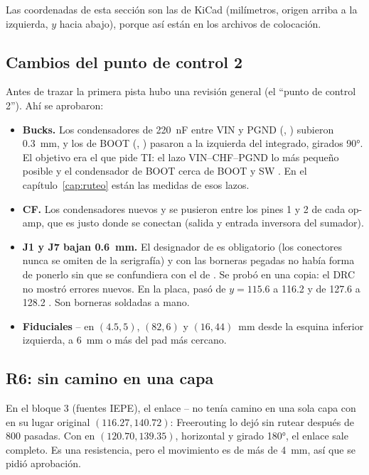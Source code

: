 Las coordenadas de esta sección son las de KiCad (milímetros, origen arriba a la izquierda, $y$ hacia abajo),
porque así están en los archivos de colocación.

\subsection{Cambios del punto de control 2}
Antes de trazar la primera pista hubo una revisión general (el ``punto de control 2''). Ahí se aprobaron:
\begin{itemize}
  \item \textbf{Bucks.} Los condensadores de \SI{220}{\nano\farad} entre VIN y PGND (, ) subieron
        \SI{0.3}{\milli\meter}, y los de BOOT (, ) pasaron a la izquierda del integrado, girados
        \ang{90}. El objetivo era el que pide TI: el lazo VIN--CHF--PGND lo más pequeño posible y el condensador de
        BOOT cerca de BOOT y SW . En el capítulo~\ref{cap:ruteo} están las medidas de esos lazos.
  \item \textbf{CF.} Los condensadores nuevos  y  se pusieron entre los pines 1 y 2 de cada op-amp,
        que es justo donde se conectan (salida y entrada inversora del sumador).
  \item \textbf{J1 y J7 bajan \SI{0.6}{\milli\meter}.} El designador de  es obligatorio (los conectores nunca
        se omiten de la serigrafía) y con las borneras pegadas no había forma de ponerlo sin que se confundiera con
        el de . Se probó en una copia: el DRC no mostró errores nuevos. En la placa,  pasó de
        $y = \num{115.6}$ a \num{116.2} y  de \num{127.6} a \num{128.2} \medido. Son borneras soldadas a mano.
  \item \textbf{Fiduciales} -- en $(\num{4.5}, \num{5})$, $(\num{82}, \num{6})$ y
        $(\num{16}, \num{44})$~\si{\milli\meter} desde la esquina inferior izquierda, a \SI{6}{\milli\meter} o más del
        pad más cercano.
\end{itemize}

\subsection{R6: sin camino en una capa}
En el bloque 3 (fuentes IEPE), el enlace -- no tenía camino en una sola capa con  en su
lugar original $(\num{116.27}, \num{140.72})$: Freerouting lo dejó sin rutear después de 800 pasadas. Con  en
$(\num{120.70}, \num{139.35})$, horizontal y girado \ang{180}, el enlace sale completo. Es una resistencia, pero el
movimiento es de más de \SI{4}{\milli\meter}, así que se pidió aprobación.

